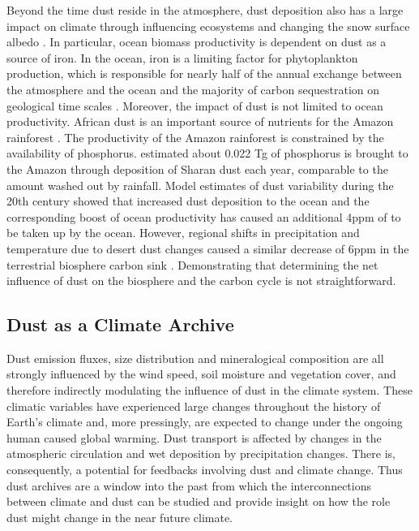 Beyond the time dust reside in the atmosphere, dust deposition also has a large impact on climate through influencing ecosystems and changing the snow surface albedo \parencite{shao2011dust} . 
In particular, ocean biomass productivity is dependent on dust as a source of iron. In the ocean, iron is a limiting factor for phytoplankton production, which is responsible for nearly half of the annual  exchange between the atmosphere and the ocean and the majority of carbon sequestration on geological time scales \parencite{shao2011dust}. Moreover, the impact of dust is not limited to ocean productivity. African dust is an important source of nutrients for the Amazon rainforest . The productivity of the Amazon rainforest is constrained by the availability of phosphorus. \textcite{yu2015fertilizing} estimated about 0.022 Tg of phosphorus is brought to the Amazon through deposition of Sharan dust each year, comparable to the amount washed out by rainfall. Model estimates of dust variability during the 20th century showed that increased dust deposition to the ocean and the corresponding boost of ocean productivity has caused an additional 4ppm of  to be taken up by the ocean. However, regional shifts in precipitation and temperature due to desert dust changes caused a similar decrease of 6ppm  in the terrestrial biosphere carbon sink \parencite{mahowald2010observed}. Demonstrating that determining the net influence of dust on the biosphere and the carbon cycle is not straightforward.
\subsection{Dust as a Climate Archive}
Dust emission fluxes, size distribution and mineralogical composition are all strongly influenced by the wind speed, soil moisture and vegetation cover, and therefore indirectly modulating the influence of dust in the climate system. 
These climatic variables have experienced large changes throughout the history of Earth's climate and, more pressingly, are expected to change under the ongoing human caused global warming. Dust transport is affected by changes in the atmospheric circulation and wet deposition by precipitation changes. There is, consequently,
a potential for feedbacks involving dust and climate change. Thus dust archives are a window into the past from which the interconnections between climate and dust can be studied and provide insight on how the role dust might change in the near future climate. 

